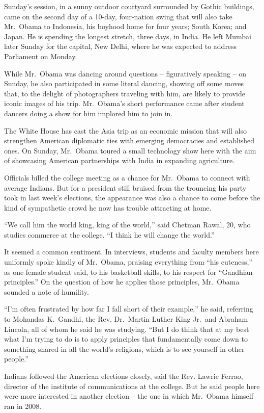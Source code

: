 ﻿\documentclass[12pt]{article}
\begin{document}
Sunday's session, in a sunny outdoor courtyard surrounded by Gothic buildings, came on the second
day of a 10-day, four-nation swing that will also take Mr.~Obama to Indonesia, his boyhood home for
four years; South Korea; and Japan. He is spending the longest stretch, three days, in India. He
left Mumbai later Sunday for the capital, New Delhi, where he was expected to address Parliament on
Monday.

While Mr.~Obama was dancing around questions -- figuratively speaking -- on Sunday, he also
participated in some literal dancing, showing off some moves that, to the delight of photographers
traveling with him, are likely to provide iconic images of his trip. Mr.~Obama's short performance
came after student dancers doing a show for him implored him to join in.

The White House has cast the Asia trip as an economic mission that will also strengthen American
diplomatic ties with emerging democracies and established ones. On Sunday, Mr.~Obama toured a small
technology show here with the aim of showcasing American partnerships with India in expanding
agriculture.

Officials billed the college meeting as a chance for Mr.~Obama to connect with average Indians. But
for a president still bruised from the trouncing his party took in last week's elections, the
appearance was also a chance to come before the kind of sympathetic crowd he now has trouble
attracting at home.

``We call him the world king, king of the world,'' said Chetman Rawal, 20, who studies commerce at
the college. ``I think he will change the world.''

It seemed a common sentiment. In interviews, students and faculty members here uniformly spoke
kindly of Mr.~Obama, praising everything from ``his cuteness,'' as one female student said, to his
basketball skills, to his respect for ``Gandhian principles.'' On the question of how he applies
those principles, Mr.~Obama sounded a note of humility.

``I'm often frustrated by how far I fall short of their example,'' he said, referring to Mohandas
K.~Gandhi, the Rev. Dr.~Martin Luther King Jr.~and Abraham Lincoln, all of whom he said he was
studying. ``But I do think that at my best what I'm trying to do is to apply principles that
fundamentally come down to something shared in all the world's religions, which is to see yourself
in other people.''

Indians followed the American elections closely, said the Rev. Lawrie Ferrao, director of the
institute of communications at the college. But he said people here were more interested in another
election -- the one in which Mr.~Obama himself ran in 2008.
\end{document}
